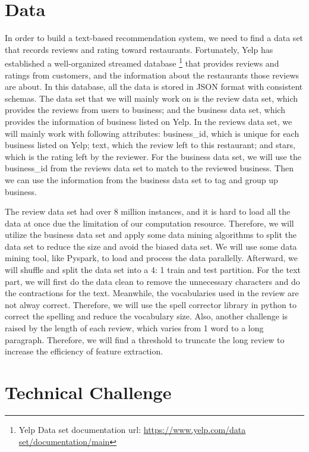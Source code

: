 \documentclass[11pt]{article}
\begin{document}
\section{Data}

In order to build a text-based recommendation system, we need to find a data set that records reviews and rating toward restaurants. Fortunately, Yelp has established a well-organized streamed database \footnote{Yelp Data set documentation url: \url{https://www.yelp.com/data set/documentation/main}} that provides reviews and ratings from customers, and the information about the restaurants those reviews are about. In this database, all the data is stored in JSON format with consistent schemas. The data set that we will mainly work on is the review data set, which provides the reviews from users to business; and the business data set, which provides the information of business listed on Yelp. In the reviews data set, we will mainly work with following attributes: business\_id, which is unique for each business listed on Yelp; text, which the review left to this restaurant; and stars, which is the rating left by the reviewer. For the business data set, we will use the business\_id from the reviews data set to match to the reviewed business. Then we can use the information from the business data set to tag and group up business.

The review data set had over 8 million instances, and it is hard to load all the data at once due the limitation of our computation resource. Therefore, we will utilize the business data set and apply some data mining algorithms to split the data set to reduce the size and avoid the biased data set. We will use some data mining tool, like Pyspark, to load and process the data parallelly. Afterward, we will shuffle and split the data set into a 4: 1 train and test partition. For the text part, we will first do the data clean to remove the unnecessary characters and do the contractions for the text. Meanwhile, the vocabularies used in the review are not alway correct. Therefore, we will use the spell corrector library in python to correct the spelling and reduce the vocabulary size. Also, another challenge is raised by the length of each review, which varies from 1 word to a long paragraph. Therefore, we will find a threshold to truncate the long review to increase the efficiency of feature extraction.


\section{Technical Challenge}
\end{document}
